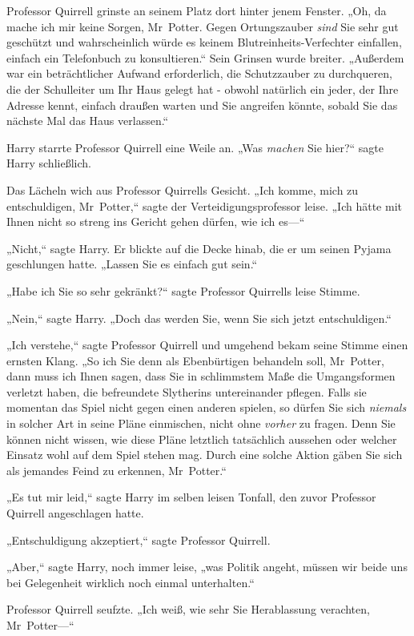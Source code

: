 {Professor Quirrell grinste an seinem Platz dort hinter jenem Fenster. „Oh, da mache ich mir keine Sorgen, Mr~Potter. Gegen Ortungszauber \emph{sind} Sie sehr gut geschützt und wahrscheinlich würde es keinem Blutreinheits-Verfechter einfallen, einfach ein Telefonbuch zu konsultieren.“ Sein Grinsen wurde breiter. „Außerdem war ein beträchtlicher Aufwand erforderlich, die Schutzzauber zu durchqueren, die der Schulleiter um Ihr Haus gelegt hat - obwohl natürlich ein jeder, der Ihre Adresse kennt, einfach draußen warten und Sie angreifen könnte, sobald Sie das nächste Mal das Haus verlassen.“

Harry starrte Professor Quirrell eine Weile an. „Was \emph{machen} Sie hier?“ sagte Harry schließlich.

Das Lächeln wich aus Professor Quirrells Gesicht. „Ich komme, mich zu entschuldigen, Mr~Potter,“ sagte der Verteidigungsprofessor leise. „Ich hätte mit Ihnen nicht so streng ins Gericht gehen dürfen, wie ich es—“

„Nicht,“ sagte Harry. Er blickte auf die Decke hinab, die er um seinen Pyjama geschlungen hatte. „Lassen Sie es einfach gut sein.“

„Habe ich Sie so sehr gekränkt?“ sagte Professor Quirrells leise Stimme.

„Nein,“ sagte Harry. „Doch das werden Sie, wenn Sie sich jetzt entschuldigen.“

„Ich verstehe,“ sagte Professor Quirrell und umgehend bekam seine Stimme einen ernsten Klang. „So ich Sie denn als Ebenbürtigen behandeln soll, Mr~Potter, dann muss ich Ihnen sagen, dass Sie in schlimmstem Maße die Umgangsformen verletzt haben, die befreundete Slytherins untereinander pflegen. Falls sie momentan das Spiel nicht gegen einen anderen spielen, so dürfen Sie sich \emph{niemals} in solcher Art in seine Pläne einmischen, nicht ohne \emph{vorher} zu fragen. Denn Sie können nicht wissen, wie diese Pläne letztlich tatsächlich aussehen oder welcher Einsatz wohl auf dem Spiel stehen mag. Durch eine solche Aktion gäben Sie sich als jemandes Feind zu erkennen, Mr~Potter.“

„Es tut mir leid,“ sagte Harry im selben leisen Tonfall, den zuvor Professor Quirrell angeschlagen hatte.

„Entschuldigung akzeptiert,“ sagte Professor Quirrell.

„Aber,“ sagte Harry, noch immer leise, „was Politik angeht, müssen wir beide uns bei Gelegenheit wirklich noch einmal unterhalten.“

Professor Quirrell seufzte. „Ich weiß, wie sehr Sie Herablassung verachten, Mr~Potter—“

}
